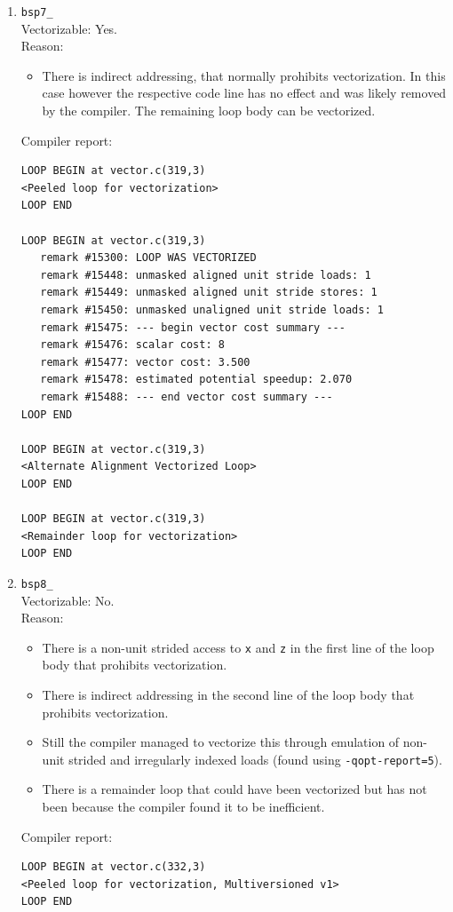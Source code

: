\documentclass[11pt]{article}
\begin{document}
\begin{enumerate}
\item \texttt{bsp7\_}\\
Vectorizable: Yes.\\
Reason:
\begin{itemize}
\item There is indirect addressing, that normally prohibits vectorization. In this case however the respective code line has no effect and was likely removed by the compiler. The remaining loop body can be vectorized.
\end{itemize}
Compiler report:
\begin{lstlisting}
LOOP BEGIN at vector.c(319,3)
<Peeled loop for vectorization>
LOOP END

LOOP BEGIN at vector.c(319,3)
   remark #15300: LOOP WAS VECTORIZED
   remark #15448: unmasked aligned unit stride loads: 1 
   remark #15449: unmasked aligned unit stride stores: 1 
   remark #15450: unmasked unaligned unit stride loads: 1 
   remark #15475: --- begin vector cost summary ---
   remark #15476: scalar cost: 8 
   remark #15477: vector cost: 3.500 
   remark #15478: estimated potential speedup: 2.070 
   remark #15488: --- end vector cost summary ---
LOOP END

LOOP BEGIN at vector.c(319,3)
<Alternate Alignment Vectorized Loop>
LOOP END

LOOP BEGIN at vector.c(319,3)
<Remainder loop for vectorization>
LOOP END
\end{lstlisting}

\item \texttt{bsp8\_}\\
Vectorizable: No.\\
Reason:
\begin{itemize}
\item There is a non-unit strided access to \texttt{x} and \texttt{z} in the first line of the loop body that prohibits vectorization.
\item There is indirect addressing in the second line of the loop body that prohibits vectorization.
\item Still the compiler managed to vectorize this through emulation of non-unit strided and irregularly indexed loads (found using \texttt{-qopt-report=5}).
\item There is a remainder loop that could have been vectorized but has not been because the compiler found it to be inefficient.
\end{itemize}
Compiler report:
\begin{lstlisting}
LOOP BEGIN at vector.c(332,3)
<Peeled loop for vectorization, Multiversioned v1>
LOOP END


\end{lstlisting}
\end{enumerate}
\end{document}
